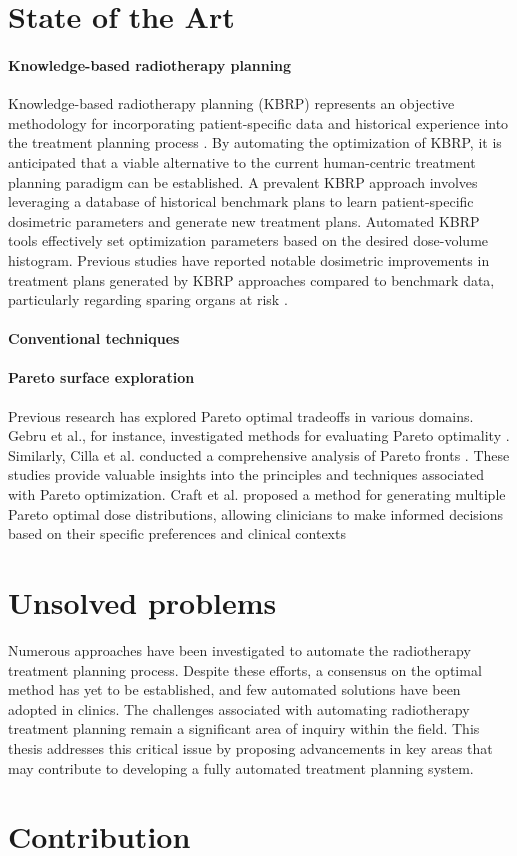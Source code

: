 \section{State of the Art}
\paragraph{Knowledge-based radiotherapy planning}
Knowledge-based radiotherapy planning (KBRP) represents an objective methodology for incorporating patient-specific data and historical experience into the treatment planning process \cite{Nwankwo_2014}.
By automating the optimization of KBRP, it is anticipated that a viable alternative to the current human-centric treatment planning paradigm can be established.
A prevalent KBRP approach involves leveraging a database of historical benchmark plans to learn patient-specific dosimetric parameters and generate new treatment plans.
Automated KBRP tools effectively set optimization parameters based on the desired dose-volume histogram.
Previous studies have reported notable dosimetric improvements in treatment plans generated by KBRP approaches compared to benchmark data, particularly regarding sparing organs at risk \cite{Fogliata2014,Tol2015}.

\paragraph{Conventional techniques}

\paragraph{Pareto surface exploration}
Previous research has explored Pareto optimal tradeoffs in various domains.
Gebru et al., for instance, investigated methods for evaluating Pareto optimality \cite{Gebru2023}.
Similarly, Cilla et al. conducted a comprehensive analysis of Pareto fronts \cite{Cilla2018}.
These studies provide valuable insights into the principles and techniques associated with Pareto optimization.
Craft et al. proposed a method for generating multiple Pareto optimal dose distributions, allowing clinicians to make informed decisions based on their specific preferences and clinical contexts \cite{Craft2007}

\section{Unsolved problems}
Numerous approaches have been investigated to automate the radiotherapy treatment planning process.
Despite these efforts, a consensus on the optimal method has yet to be established, and few automated solutions have been adopted in clinics.
The challenges associated with automating radiotherapy treatment planning remain a significant area of inquiry within the field.
This thesis addresses this critical issue by proposing advancements in key areas that may contribute to developing a fully automated treatment planning system.

\section{Contribution}
